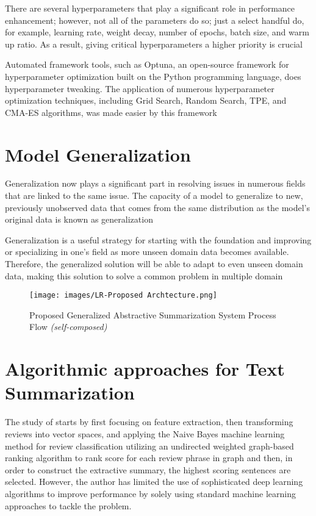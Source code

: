 \documentclass[manuscript,screen,natbib=false]{acmart}
\begin{document}
There are several hyperparameters that play a significant role in performance enhancement; however, not all of the parameters do so; just a select handful do, for example, learning rate, weight decay, number of epochs, batch size, and warm up ratio. As a result, giving critical hyperparameters a higher priority is crucial \cite{engdahl_2008}

Automated framework tools, such as Optuna, an open-source framework for hyperparameter optimization built on the Python programming language, does hyperparameter tweaking. The application of numerous hyperparameter optimization techniques, including Grid Search, Random Search, TPE, and CMA-ES algorithms, was made easier by this framework \cite{joy_selvan_2022}

\section{Model Generalization}

Generalization now plays a significant part in resolving issues in numerous fields that are linked to the same issue. The capacity of a model to generalize to new, previously unobserved data that comes from the same distribution as the model's original data is known as generalization \cite{semantic_scholar} 

Generalization is a useful strategy for starting with the foundation and improving or specializing in one's field as more unseen domain data becomes available. Therefore, the generalized solution will be able to adapt to even unseen domain data, making this solution to solve a common problem in multiple domain \cite{Zhou_2021}

\begin{figure}[h]
\centering
\texttt{[image: images/LR-Proposed Archtecture.png]}
\caption{Proposed Generalized Abstractive Summarization System Process Flow \textit{(self-composed)}}
\label{fig:model-generalization-for-abstractive-text-summarization}
\end{figure}

\section{Algorithmic approaches for Text Summarization}
The study of \cite{khan_gul_zareei_biswal_zeb_naeem_saeed_salim_2020} starts by first focusing on feature extraction, then transforming reviews into vector spaces, and applying the Naive Bayes machine learning method for review classification utilizing an undirected weighted graph-based ranking algorithm to rank score for each review phrase in graph and then, in order to construct the extractive summary, the highest scoring sentences are selected. However, the author has limited the use of sophisticated deep learning algorithms to improve performance by solely using standard machine learning approaches to tackle the problem.
\end{document}
